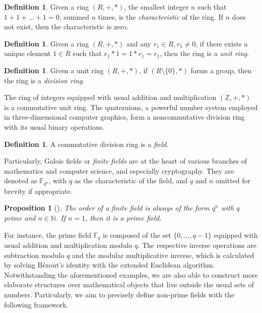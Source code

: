 \documentclass[draft, 12pt, a4paper, oneside]{memoir}
\newtheorem{proposition}[theorem]{Proposition}
\theoremstyle{definition}
\newtheorem{definition}[theorem]{Definition}
\begin{document}
\begin{definition}
  Given a ring $(R, +, \ast)$, the smallest integer $n$ such that $1 + 1 + \dots + 1 = 0$, summed $n$ times, is the \emph{characteristic} of the ring. If $n$ does not exist, then the characteristic is zero.
\end{definition}

\begin{definition}
  Given a ring $(R, +, \ast)$ and any $r_{1} \in R, r_{1} \neq 0$, if there exists a unique element $1 \in R$ such that $r_{1} \ast 1 = 1 \ast r_{1} = r_{1}$, then the ring is a \emph{unit ring}.
\end{definition}


\begin{definition}
  Given a unit ring $(R, +, \ast)$, if $(R \setminus \{0\}, \ast)$ forms a group, then the ring is a \emph{division ring}.
\end{definition}

The ring of integers equipped with usual addition and multiplication $(\mathbb{Z}, +, \ast)$ is a commutative unit ring. The quaternions, a powerful number system employed in three-dimensional computer graphics, form a noncommutative division ring with its usual binary operations.

\begin{definition}
  A commutative division ring is a \emph{field}.
\end{definition}

Particularly, Galois fields or \emph{finite fields} are at the heart of various branches of mathematics and computer science, and especially cryptography. They are denoted as $\mathbb{F}_{q^{n}}$, with $q$ as the characteristic of the field, and $q$ and $n$ omitted for brevity if appropriate.

\begin{proposition}[{\cite[Corollary 2.18]{Mullen:2013}}]
  The order of a finite field is always of the form $q^{n}$ with $q$ prime and $n \in \mathbb{N}$. If $n = 1$, then it is a \emph{prime field}.
\end{proposition}

For instance, the prime field $\mathbb{F}_{q}$ is composed of the set $\{0, \dots, q - 1\}$ equipped with usual addition and multiplication modulo $q$. The respective inverse operations are subtraction modulo $q$ and the modular multiplicative inverse, which is calculated by solving Bézout's identity with the extended Euclidean algorithm. Notwithstanding the aforementioned examples, we are also able to construct more elaborate structures over mathematical objects that live outside the usual sets of numbers. Particularly, we aim to precisely define non-prime fields with the following framework.
\end{document}
